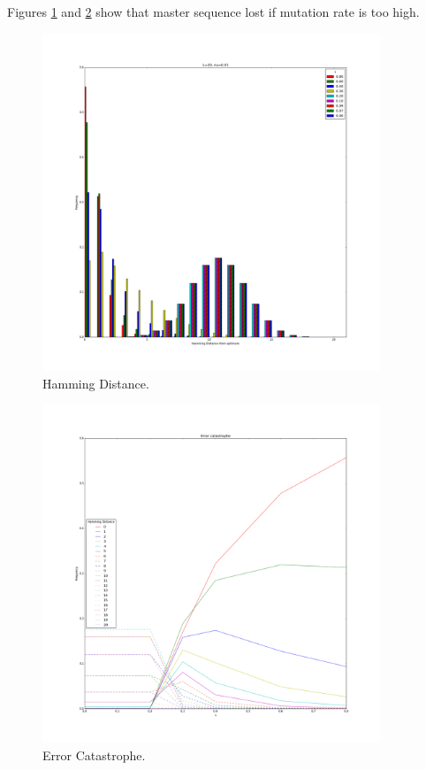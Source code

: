 \documentclass[]{article}
\begin{document}
Figures \ref{fig:ErrorCatastrophe1} and \ref{fig:ErrorCatastrophe2} show that master sequence lost if mutation rate is too high. 
\begin{figure}[H]
	\caption{Hamming Distance.}\label{fig:ErrorCatastrophe1} 
	\includegraphics[width=0.9\textwidth]{ErrorCatastrophe1}
\end{figure}
\begin{figure}[H]
	\caption{Error Catastrophe.}\label{fig:ErrorCatastrophe2} 
	\includegraphics[width=0.9\textwidth]{ErrorCatastrophe2}
\end{figure}
\end{document}
